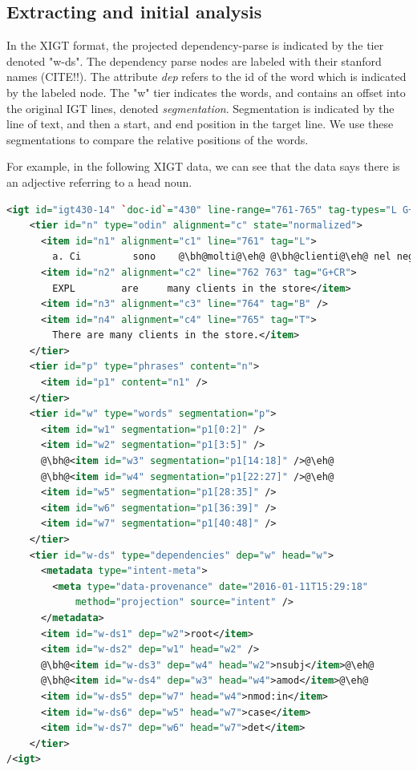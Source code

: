 \documentclass[]{aiaa-tc}
\begin{document}
\par
\subsection{Extracting and initial analysis}
In the XIGT format, the projected dependency-parse is indicated by the tier denoted "w-ds".  The dependency parse nodes are labeled with their stanford names (CITE!!).  The attribute \textit{dep} refers to the id of the word which is indicated by the labeled node.  The "w" tier indicates the words, and contains an offset into the original IGT lines, denoted \textit{segmentation}.  Segmentation is indicated by the line of text, and then a start, and end position in the target line.  We use these segmentations to compare the relative positions of the words.

For example, in the following XIGT data, we can see that the data says there is an adjective referring to a head noun.

\begin{lstlisting}[escapechar=@, language=XML, basicstyle=\sffamily, columns=fullflexible]
<igt id="igt430-14" `doc-id`="430" line-range="761-765" tag-types="L G+CR G+CR B T">
    <tier id="n" type="odin" alignment="c" state="normalized">
      <item id="n1" alignment="c1" line="761" tag="L">
        a. Ci         sono    @\bh@molti@\eh@ @\bh@clienti@\eh@ nel negozio.</item>
      <item id="n2" alignment="c2" line="762 763" tag="G+CR">
        EXPL        are     many clients in the store</item>
      <item id="n3" alignment="c3" line="764" tag="B" />
      <item id="n4" alignment="c4" line="765" tag="T">
        There are many clients in the store.</item>
    </tier>
    <tier id="p" type="phrases" content="n">
      <item id="p1" content="n1" />
    </tier>
    <tier id="w" type="words" segmentation="p">
      <item id="w1" segmentation="p1[0:2]" />
      <item id="w2" segmentation="p1[3:5]" />
      @\bh@<item id="w3" segmentation="p1[14:18]" />@\eh@
      @\bh@<item id="w4" segmentation="p1[22:27]" />@\eh@
      <item id="w5" segmentation="p1[28:35]" />
      <item id="w6" segmentation="p1[36:39]" />
      <item id="w7" segmentation="p1[40:48]" />
    </tier>
    <tier id="w-ds" type="dependencies" dep="w" head="w">
      <metadata type="intent-meta">
        <meta type="data-provenance" date="2016-01-11T15:29:18"
            method="projection" source="intent" />
      </metadata>
      <item id="w-ds1" dep="w2">root</item>
      <item id="w-ds2" dep="w1" head="w2" />
      @\bh@<item id="w-ds3" dep="w4" head="w2">nsubj</item>@\eh@
      @\bh@<item id="w-ds4" dep="w3" head="w4">amod</item>@\eh@
      <item id="w-ds5" dep="w7" head="w4">nmod:in</item>
      <item id="w-ds6" dep="w5" head="w7">case</item>
      <item id="w-ds7" dep="w6" head="w7">det</item>
    </tier>
/<igt>    
\end{lstlisting}
\end{document}
